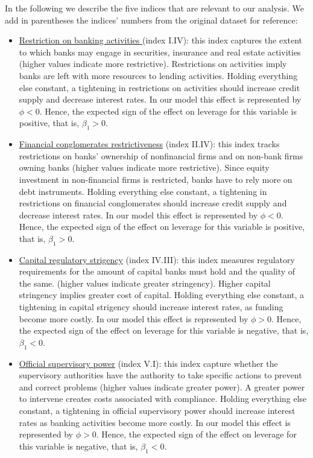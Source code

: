 \documentclass[12pt]{article}
\begin{document}
     In the following we describe the five indices that are relevant to our analysis. We add in parentheses the indices' numbers from the original dataset for reference:
      \begin{itemize}
     	\item \underline{Restriction on banking activities } (index I.IV): this index captures the extent to which banks may engage in securities, insurance and real estate activities (higher values indicate more restrictive). Restrictions on activities imply banks are left with more resources to lending activities. Holding everything else constant, a tightening in restrictions on activities should increase credit supply and decrease interest rates. In our model this effect is represented by $\phi<0$. Hence, the expected sign of the effect on leverage for this variable is positive, that is, $\beta_1>0$.  
     	\item \underline{Financial conglomerates restrictiveness} (index II.IV): this index tracks restrictions on banks' ownership of nonfinancial firms and on non-bank firms owning banks (higher values indicate more restrictive). Since equity investment in non-financial firms is restricted, banks have to rely more on debt instruments. Holding everything else constant, a tightening in restrictions on financial conglomerates should increase credit supply and decrease interest rates. In our model this effect is represented by $\phi<0$. Hence, the expected sign of the effect on leverage for this variable is positive, that is, $\beta_1>0$. 
     	\item  \underline{Capital regulatory strigency} (index IV.III): this index measures regulatory requirements for the amount of capital banks must hold and the quality of the same. (higher values indicate greater stringency). Higher capital stringency implies greater cost of capital. Holding everything else constant, a tightening in capital strigency should increase interest rates, as funding become more costly. In our model this effect is represented by $\phi>0$. Hence, the expected sign of the effect on leverage for this variable is negative, that is, $\beta_1<0$.
     	\item \underline{Official supervisory power} (index V.I): this index capture whether the supervisory authorities have the authority to take specific actions to prevent and correct problems (higher values indicate greater power). A greater power to intervene creates costs associated with compliance. Holding everything else constant, a tightening in official supervisory power should increase interest rates as banking activities become more costly. In our model this effect is represented by $\phi>0$. Hence, the expected sign of the effect on leverage for this variable is negative, that is, $\beta_1<0$.
     \end{itemize} 
	  
\end{document}
